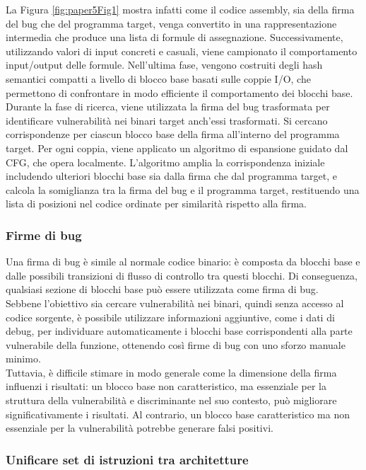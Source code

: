 \documentclass[12pt,a4paper,openright,twoside]{report}
\begin{document}
La Figura \ref{fig:paper5Fig1} mostra infatti come il codice assembly, sia della firma del bug che del programma target, venga convertito in una rappresentazione intermedia che produce una lista di formule di assegnazione. Successivamente, utilizzando valori di input concreti e casuali, viene campionato il comportamento input/output delle formule. Nell'ultima fase, vengono costruiti degli hash semantici compatti a livello di blocco base basati sulle coppie I/O, che permettono di confrontare in modo efficiente il comportamento dei blocchi base.\\
Durante la fase di ricerca, viene utilizzata la firma del bug trasformata per identificare vulnerabilità nei binari target anch'essi trasformati. Si cercano corrispondenze per ciascun blocco base della firma all'interno del programma target. Per ogni coppia, viene applicato un algoritmo di espansione guidato dal CFG, che opera localmente. L'algoritmo amplia la corrispondenza iniziale includendo ulteriori blocchi base sia dalla firma che dal programma target, e calcola la somiglianza tra la firma del bug e il programma target, restituendo una lista di posizioni nel codice ordinate per similarità rispetto alla firma.

\subsubsection{Firme di bug}

Una firma di bug è simile al normale codice binario: è composta da blocchi base e dalle possibili transizioni di flusso di controllo tra questi blocchi. Di conseguenza, qualsiasi sezione di blocchi base può essere utilizzata come firma di bug.\\
Sebbene l’obiettivo sia cercare vulnerabilità nei binari, quindi senza accesso al codice sorgente, è possibile utilizzare informazioni aggiuntive, come i dati di debug, per individuare automaticamente i blocchi base corrispondenti alla parte vulnerabile della funzione, ottenendo così firme di bug con uno sforzo manuale minimo.\\
Tuttavia, è difficile stimare in modo generale come la dimensione della firma influenzi i risultati: un blocco base non caratteristico, ma essenziale per la struttura della vulnerabilità e discriminante nel suo contesto, può migliorare significativamente i risultati. Al contrario, un blocco base caratteristico ma non essenziale per la vulnerabilità potrebbe generare falsi positivi.

\subsubsection{Unificare set di istruzioni tra architetture}
\end{document}
